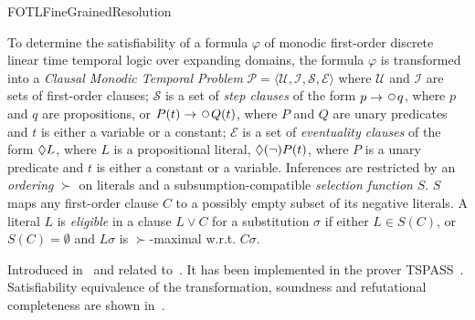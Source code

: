 \begin{entry}{FOTLFineGrainedResolution}
\begin{clarifications}
  To determine the satisfiability of a formula $\varphi$ of monodic first-order
  discrete linear time temporal logic over expanding domains, the
  formula $\varphi$ is transformed into a \emph{Clausal Monodic Temporal Problem}
  $\mathcal{P} = \langle \mathcal{U, I, S, E} \rangle$ 
  where $\mathcal{U}$
  and $\mathcal{I}$ 
  are sets of first-order clauses;
  $\mathcal{S}$ 
  is a set of \emph{step clauses} of the form
  $p\rightarrow\Next q$,
  where $p$ and $q$ are propositions, or
  $P(t)\rightarrow\Next Q(t)$, where $P$ and $Q$ are unary predicates
  and $t$ is either a variable or a constant;
  $\mathcal{E}$  
  is a set of \emph{eventuality clauses}
  of the form $\Diamond L$, where $L$ is a propositional literal,
  $\Diamond (\neg)P(t)$, where $P$ is a unary predicate and $t$ is
  either a constant or a variable.
  Inferences are restricted by an \emph{ordering} $\succ$ on literals
  and a subsumption-compatible \emph{selection function} $S$. $S$ maps
  any first-order clause $C$ to a possibly empty subset of its negative literals. 
  A literal $L$ is \emph{eligible} in a clause $L\lor C$ for a
  substitution $\sigma$ if either $L\in S(C)$, or $S(C)=\emptyset$  and
  $L\sigma$ is $\succ$-maximal w.r.t. $C\sigma$.
\end{clarifications}

\begin{history}
  Introduced in~\cite{Ludwig+Hustadt@CADE2009} and related
  to~.
  It has been implemented in the prover
  TSPASS~\cite{Ludwig+Hustadt@AIC2010}. Satisfiability equivalence of the
  transformation, soundness and refutational completeness are
  shown in~\cite{Ludwig@Liverpool2010}.
\end{history}

\end{entry}
